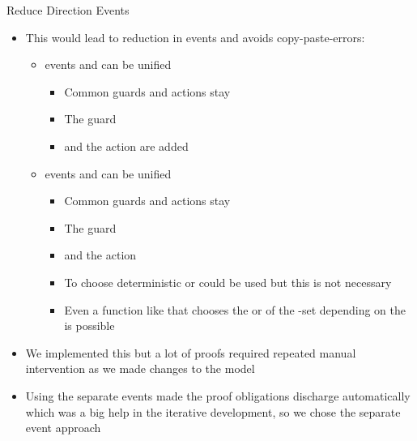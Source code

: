 \documentclass[
	hyperref={pdfusetitle,hidelinks},
	10pt,
    handout,
]{beamer}
\begin{document}
\begin{frame}{Reduce Direction Events}
	\begin{itemize}
		\item This would lead to reduction in events and avoids copy-paste-errors:
		\begin{itemize}
			\item events  and  can be unified
			\begin{itemize}
				\item Common guards and actions stay
				\item The guard 
				\item and the action  are added
			\end{itemize}
			\item events  and  can be unified
			\begin{itemize}
				\item Common guards and actions stay
				\item The guard 
				\item and the action 
				\item To choose deterministic  or  could be used but this is not necessary
				\item Even a function like  that chooses the  or  of the -set depending on the  is possible
			\end{itemize}
		\end{itemize}
		\item We implemented this but a lot of proofs required repeated manual intervention as we made changes to the model
		\item Using the separate events made the proof obligations discharge automatically which was a big help in the iterative development, so we chose the separate event approach
	\end{itemize}
\end{frame}
\end{document}
